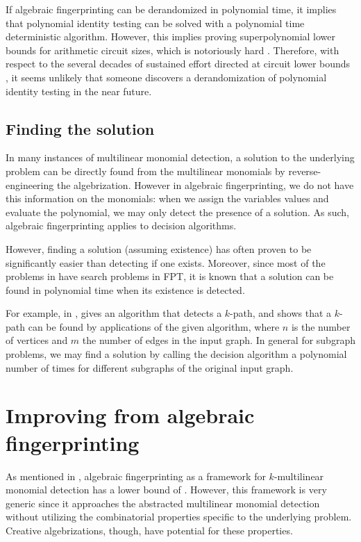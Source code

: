 If algebraic fingerprinting can be derandomized 
in polynomial time, it implies that polynomial identity testing can be solved with a 
polynomial time deterministic algorithm. However, this implies proving superpolynomial 
lower bounds for arithmetic circuit sizes, which is notoriously hard \cite{Kabanets03}. 
Therefore, with respect to the several decades of 
sustained effort directed at circuit lower bounds \cite{Kabanets03}, 
it seems unlikely that someone discovers a derandomization of polynomial identity testing 
in the near future.

\subsection{Finding the solution}
\label{sect:finding_the_solution}

In many instances of multilinear monomial detection, 
a solution to the underlying problem can be directly found 
from the multilinear monomials by 
reverse-engineering the algebrization. 
However in algebraic fingerprinting, we do not have this information on the monomials: 
when we assign the variables values and evaluate the polynomial, we may only detect the 
presence of a solution. As such, algebraic fingerprinting applies to decision algorithms.

However, finding a solution (assuming existence) 
has often proven to be significantly easier than detecting if one exists. 
Moreover, since most of the problems in  
have search problems in FPT, it is known that a solution can be found in polynomial time when its 
existence is detected.

For example, in \cite{Koutis08}, 
\cite{Koutis08} gives an algorithm that detects a $k$-path, and shows that a 
$k$-path can be found by  applications of the given
algorithm, where $n$ is the number of vertices and $m$ the number of edges in the input graph. 
In general for subgraph problems, we may find a solution by calling the decision 
algorithm a polynomial number of times for different subgraphs of the original input graph.

\section{Improving from algebraic fingerprinting}
\label{sect:improvements}

As mentioned in , 
algebraic fingerprinting as a framework 
for $k$-multilinear monomial detection has a lower bound of . 
However, this framework is very generic since it 
approaches the abstracted multilinear monomial detection without 
utilizing the combinatorial properties specific to the underlying problem. 
Creative algebrizations, though, 
have potential for these properties.

